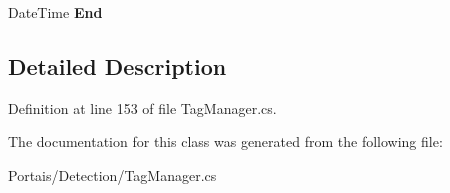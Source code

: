 \begin{DoxyCompactItemize}
\item 
Date\+Time {\bfseries End}\hypertarget{class_portais_1_1_detection_1_1_tag_manager_1_1_state_changed_args_a0a1460b22d3bd53203d8fd1b43698847}{}\label{class_portais_1_1_detection_1_1_tag_manager_1_1_state_changed_args_a0a1460b22d3bd53203d8fd1b43698847}

\end{DoxyCompactItemize}


\subsection{Detailed Description}


Definition at line 153 of file Tag\+Manager.\+cs.



The documentation for this class was generated from the following file\+:\begin{DoxyCompactItemize}
\item 
Portais/\+Detection/Tag\+Manager.\+cs\end{DoxyCompactItemize}
